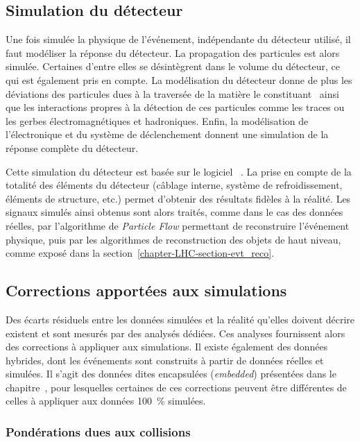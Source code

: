 \subsection{Simulation du détecteur}\label{chapter-LHC-section-MC-subsec-detector_sim}
Une fois simulée la physique de l'événement, indépendante du détecteur utilisé, il faut modéliser la réponse du détecteur.
La propagation des particules est alors simulée. %
Certaines d'entre elles se désintègrent dans le volume du détecteur, ce qui est également pris en compte.
La modélisation du détecteur donne de plus les déviations des particules dues à la traversée de la matière le constituant~\cite{moliere_scat_1,moliere_scat_2} ainsi que les interactions propres à la détection de ces particules comme les traces ou les gerbes électromagnétiques et hadroniques.
Enfin, la modélisation de l'électronique et du système de déclenchement donnent une simulation de la réponse complète du détecteur.%
\par
Cette simulation du détecteur est basée sur le logiciel
\GEANTfour~\cite{geant4_2003,geant4_2006,geant4_2016}.
La prise en compte de la totalité des éléments du détecteur (câblage interne, système de refroidissement, éléments de structure, etc.) permet d'obtenir des résultats fidèles à la réalité.
Les signaux simulés ainsi obtenus sont alors traités, comme dans le cas des données réelles, par l'algorithme de \emph{Particle Flow} permettant de reconstruire l'événement physique, puis par les algorithmes de reconstruction des objets de haut niveau, comme exposé dans la section~\ref{chapter-LHC-section-evt_reco}.
\subsection{Corrections apportées aux simulations}
Des écarts résiduels entre les données simulées et la réalité qu'elles doivent décrire existent et sont mesurés par des analysés dédiées.
Ces analyses fournissent alors des corrections à appliquer aux simulations.
Il existe également des données hybrides, dont les événements sont construits à partir de données réelles et simulées.
Il s'agit des données dites \og encapsulées \fg{} (\emph{embedded}) présentées dans le chapitre~, pour lesquelles certaines de ces corrections peuvent être différentes de celles à appliquer aux données \SI{100}{\%} simulées.
\subsubsection{Pondérations dues aux collisions}
